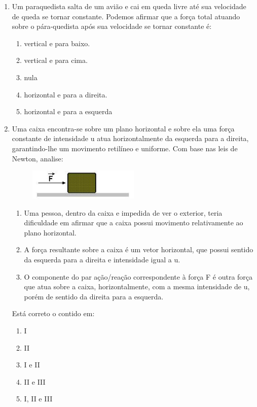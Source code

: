 \documentclass[12pt,letterpaper,fleqn]{article}
\begin{document}
\begin{enumerate}
    \item Um paraquedista salta de um avião e cai em queda livre até sua velocidade de queda se tornar constante. Podemos afirmar que a força total atuando sobre o pára-quedista após sua velocidade se tornar constante é:
    \begin{enumerate}
        \item vertical e para baixo. 
        \item vertical e para cima. 
        \item nula
        \item horizontal e para a direita.
        \item horizontal e para a esquerda
    \end{enumerate}
    
    \item Uma caixa encontra-se sobre um plano horizontal e sobre ela uma força constante de intensidade u atua horizontalmente da esquerda para a direita, garantindo-lhe um movimento retilíneo e uniforme. Com base nas leis de Newton, analise:
    \begin{figure}[h]
        \centering
        \includegraphics[width=0.5\textwidth]{ex_2.jpg}
    \end{figure}
    \begin{enumerate}[I]
        \item Uma pessoa, dentro da caixa e impedida de ver o exterior, teria dificuldade em afirmar que a caixa possui movimento relativamente ao plano horizontal.
        \item A força resultante sobre a caixa é um vetor horizontal, que possui sentido da esquerda para a direita e intensidade igual a u.
        \item O componente do par ação/reação correspondente à força F é outra força que atua sobre a caixa, horizontalmente, com a mesma intensidade de u, porém de sentido da direita para a esquerda.
    \end{enumerate}
    Está correto o contido em:
    \begin{enumerate}
        \item I
        \item II
        \item I e II 
        \item II e III
        \item I, II e III
    \end{enumerate}
    

\end{enumerate}
\end{document}
